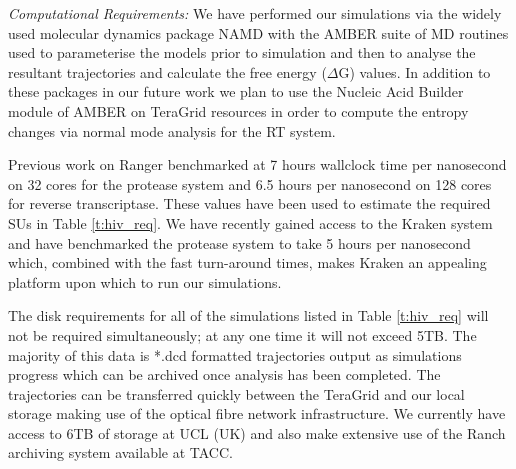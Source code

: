 \emph{Computational Requirements: } We have performed our simulations via the widely used molecular dynamics package NAMD \cite{Phillips2005} with the AMBER \cite{Case2005} suite of MD routines used to parameterise the models prior to simulation and then to analyse the resultant trajectories and calculate the free energy ($\Delta$G) values. In addition to these packages in our future work we plan to use the Nucleic Acid Builder module of AMBER on TeraGrid resources in order to compute the entropy changes via normal mode analysis for the RT system.

Previous work on Ranger benchmarked at 7 hours wallclock time per nanosecond on 32 cores for the protease system and 6.5 hours per nanosecond on 128 cores for reverse transcriptase. These values have been used to estimate the required SUs in Table \ref{t:hiv_req}. We have recently gained access to the Kraken system and have benchmarked the protease system to take 5 hours per nanosecond which, combined with the fast turn-around times, makes Kraken an appealing platform upon which to run our simulations.

The disk requirements for all of the simulations listed in Table \ref{t:hiv_req} will not be required simultaneously; at any
one time it will not exceed 5TB. The majority of this data is *.dcd formatted trajectories output as simulations progress which can be archived once analysis has been completed. The trajectories can be transferred quickly between the TeraGrid and our local storage making use of the optical fibre network infrastructure. We currently have access to 6TB of storage at UCL (UK) and also make extensive use of the Ranch archiving system available at TACC.

